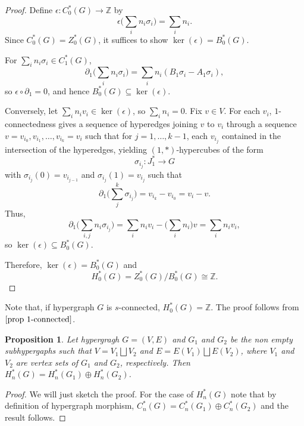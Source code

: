 \documentclass[10pt,a4paper]{amsart}
\newtheorem{prop}[subsection]{Proposition}
\begin{document}
\begin{proof}
Define $\epsilon:C_0^*(G)\to \mathbb{Z}$ by
\[
\epsilon\Big(\sum_i n_i \sigma_i\Big)=\sum_i n_i.
\]
Since $C_0^*(G)=Z_0^*(G)$, it suffices to show $\ker(\epsilon)=B_0^*(G)$.

For $\sum_i n_i \sigma_i \in C_1^*(G)$,
\[
\partial_1\Big(\sum_i n_i \sigma_i\Big)
= \sum_i n_i (B_1\sigma_i - A_1\sigma_i),
\]
so $\epsilon\circ \partial_1=0$, and hence $B_0^*(G)\subseteq \ker(\epsilon)$.

Conversely, let $\sum_i n_i v_i \in \ker(\epsilon)$, so $\sum_i n_i=0$. Fix $v\in V$. For each $v_i$, $1$-connectedness gives a sequence of hyperedges joining $v$ to $v_i$ through a sequence $v=v_{i_0},v_{i_1},\ldots,v_{i_k}=v_i$ such that for $j=1,\ldots,k-1$, each $v_{i_j}$ contained in the intersection of the hyperedges, yielding $(1,*)$-hypercubes of the form \[\sigma_{i_j}:J_1^*\to G\] with $\sigma_{i_j}(0)=v_{i_{j-1}}$ and $\sigma_{i_j}(1)=v_{i_j}$ such that 
\[
\partial_1\Big(\sum_j^k\sigma_{i_j}\Big)=v_{i_k} - v_{i_0}=v_i-v.
\]
Thus,
\[
\partial_1\Big(\sum_{i,j} n_i \sigma_{i_j}\Big)
= \sum_i n_i v_i - \Big(\sum_i n_i\Big)v
= \sum_i n_i v_i,
\]
so $\ker(\epsilon)\subseteq B_0^*(G)$.

Therefore, $\ker(\epsilon)=B_0^*(G)$ and
\[
H_0^*(G)=Z_0^*(G)/B_0^*(G)\cong \mathbb{Z}.
\]
\end{proof}

Note that, if hypergraph $G$ is $s$-connected, $H_0^*(G)=\mathbb{Z}$. The proof follows from $\ref{prop 1-connected}$.\\

\begin{prop}
	Let hypergragh $G=(V,E)$ and $G_1$ and $G_2$ be the non empty subhypergaphs such that $V=V_1 \bigsqcup V_2$ and $E= E(V_1) \bigsqcup E(V_2)$, where $V_1$ and $V_2$ are vertex sets of $G_1$ and $G_2$, respectively. Then $H_n^*(G)=H_n^*(G_1)\oplus H_n^*(G_2)$. 
\end{prop}
\begin{proof}
	We will just sketch the proof. For the case of $H_n^*(G)$ note that by definition of hypergraph morphism, $C_n^*(G)=C_n^*(G_1)\oplus C_n^*(G_2)$ and the result follows.
\end{proof}




%
\end{document}
